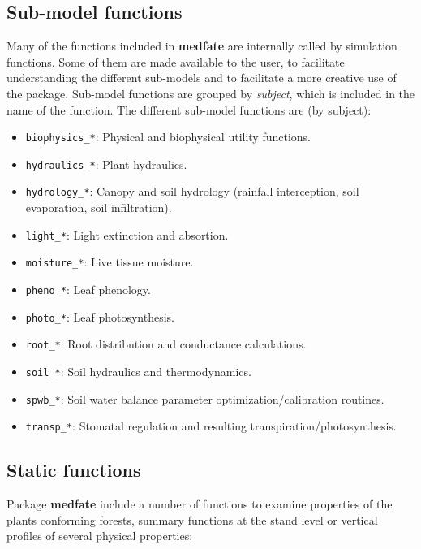 \documentclass[]{book}
\providecommand{\tightlist}{%
  \setlength{\itemsep}{0pt}\setlength{\parskip}{0pt}}
\begin{document}
\hypertarget{sub-model-functions}{%
\subsection{Sub-model functions}\label{sub-model-functions}}

Many of the functions included in \textbf{medfate} are internally called by simulation functions. Some of them are made available to the user, to facilitate understanding the different sub-models and to facilitate a more creative use of the package. Sub-model functions are grouped by \emph{subject}, which is included in the name of the function. The different sub-model functions are (by subject):

\begin{itemize}
\tightlist
\item
  \texttt{biophysics\_*}: Physical and biophysical utility functions.
\item
  \texttt{hydraulics\_*}: Plant hydraulics.
\item
  \texttt{hydrology\_*}: Canopy and soil hydrology (rainfall interception, soil evaporation, soil infiltration).
\item
  \texttt{light\_*}: Light extinction and absortion.
\item
  \texttt{moisture\_*}: Live tissue moisture.
\item
  \texttt{pheno\_*}: Leaf phenology.
\item
  \texttt{photo\_*}: Leaf photosynthesis.
\item
  \texttt{root\_*}: Root distribution and conductance calculations.
\item
  \texttt{soil\_*}: Soil hydraulics and thermodynamics.
\item
  \texttt{spwb\_*}: Soil water balance parameter optimization/calibration routines.
\item
  \texttt{transp\_*}: Stomatal regulation and resulting transpiration/photosynthesis.
\end{itemize}

\hypertarget{static-functions}{%
\subsection{Static functions}\label{static-functions}}

Package \textbf{medfate} include a number of functions to examine properties of the plants conforming forests, summary functions at the stand level or vertical profiles of several physical properties:
\end{document}

